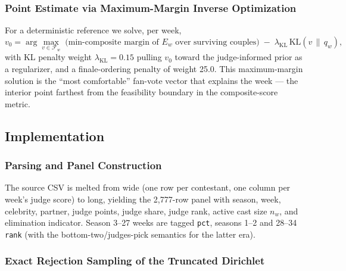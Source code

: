 \documentclass{article}
\begin{document}
\subsubsection{Point Estimate via Maximum-Margin Inverse Optimization}

For a deterministic reference we solve, per week,
\begin{equation}
v_0 = \arg\max_{v \in \mathcal{F}_w} \; \big(\text{min-composite margin of } E_w \text{ over surviving couples}\big) \;-\; \lambda_{\text{KL}}\, \mathrm{KL}(v \,\|\, q_w),
\label{eq:m1-v0}
\end{equation}
with KL penalty weight $\lambda_{\text{KL}} = 0.15$ pulling $v_0$ toward the judge-informed prior as a regularizer, and a finale-ordering penalty of weight 25.0. This maximum-margin solution is the ``most comfortable'' fan-vote vector that explains the week --- the interior point farthest from the feasibility boundary in the composite-score metric.

\subsection{Implementation}

\subsubsection{Parsing and Panel Construction}
\label{sec:m1-parsing}

The source CSV is melted from wide (one row per contestant, one column per week's judge score) to long, yielding the 2{,}777-row panel with season, week, celebrity, partner, judge points, judge share, judge rank, active cast size $n_w$, and elimination indicator. Season 3--27 weeks are tagged \texttt{pct}, seasons 1--2 and 28--34 \texttt{rank} (with the bottom-two/judges-pick semantics for the latter era).

\subsubsection{Exact Rejection Sampling of the Truncated Dirichlet}
\end{document}
